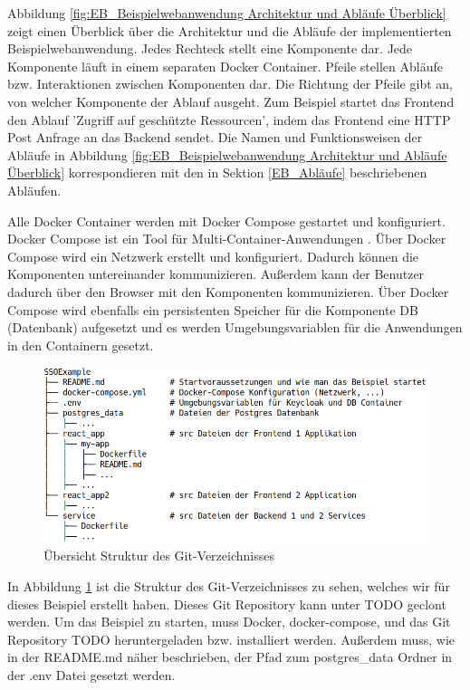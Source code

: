 Abbildung \ref{fig:EB_Beispielwebanwendung Architektur und Abläufe Überblick} zeigt einen Überblick über die Architektur und die Abläufe der implementierten Beispielwebanwendung. Jedes Rechteck stellt eine Komponente dar. Jede Komponente läuft in einem separaten Docker Container. Pfeile stellen Abläufe bzw. Interaktionen zwischen Komponenten dar. Die Richtung der Pfeile gibt an, von welcher Komponente der Ablauf ausgeht. Zum Beispiel startet das Frontend den Ablauf 'Zugriff auf geschützte Ressourcen', indem das Frontend eine HTTP Post Anfrage an das Backend sendet. Die Namen und Funktionsweisen der Abläufe in Abbildung \ref{fig:EB_Beispielwebanwendung Architektur und Abläufe Überblick} korrespondieren mit den in Sektion \ref{EB_Abläufe} beschriebenen Abläufen. 

Alle Docker Container werden mit Docker Compose gestartet und konfiguriert. Docker Compose ist ein Tool für Multi-Container-Anwendungen \cite{EB40}. Über Docker Compose wird ein Netzwerk erstellt und konfiguriert. Dadurch können die Komponenten untereinander kommunizieren. Außerdem kann der Benutzer dadurch über den Browser mit den Komponenten kommunizieren. Über Docker Compose wird ebenfalls ein persistenten Speicher für die Komponente DB (Datenbank) aufgesetzt und es werden Umgebungsvariablen für die Anwendungen in den Containern gesetzt.

\begin{figure}[!ht]
	\centering
	\includegraphics[width=1\textwidth]{Images/Ebert/srcDirectoryStructure.PNG}
	\caption{Übersicht Struktur des Git-Verzeichnisses}
	\label{fig:EB_Struktur des Git-Verzeichnisses}
\end{figure} %

In Abbildung \ref{fig:EB_Struktur des Git-Verzeichnisses} ist die Struktur des Git-Verzeichnisses zu sehen, welches wir für dieses Beispiel erstellt haben. Dieses Git Repository kann unter TODO geclont werden. Um das Beispiel zu starten, muss Docker, docker-compose, und das Git Repository TODO heruntergeladen bzw. installiert werden. Außerdem muss, wie in der README.md näher beschrieben, der Pfad zum postgres\_data Ordner in der .env Datei gesetzt werden.


